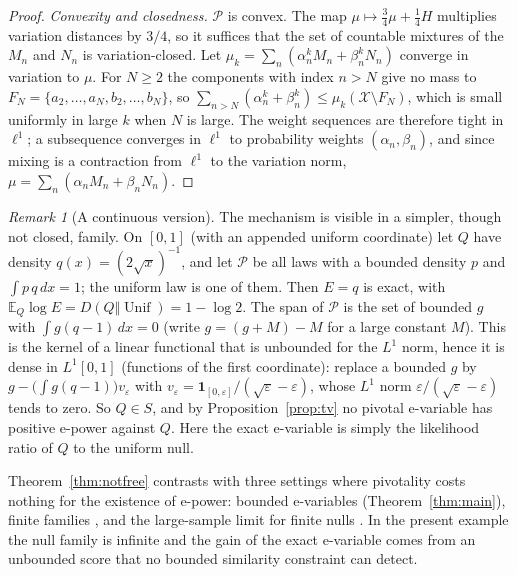 \documentclass[11pt,a4paper]{article}
\theoremstyle{definition}
\theoremstyle{remark}
\newtheorem{remark}[theorem]{Remark}
\newcommand{\PP}{\mathcal P}
\newcommand{\EE}{\mathbb E}
\newcommand{\one}{\mathbf 1}
\newcommand{\Unif}{\operatorname{Unif}}
\begin{document}
\begin{proof}
\emph{Convexity and closedness.} \(\PP\) is convex. The map \(\mu\mapsto\frac34\mu+\frac14H\) multiplies variation distances by \(3/4\), so it suffices that the set of countable mixtures of the \(M_n\) and \(N_n\) is variation-closed. Let \(\mu_k=\sum_n(\alpha^k_nM_n+\beta^k_nN_n)\) converge in variation to \(\mu\). For \(N\ge2\) the components with index \(n>N\) give no mass to \(F_N=\{a_2,\dots,a_N,b_2,\dots,b_N\}\), so \(\sum_{n>N}(\alpha^k_n+\beta^k_n)\le\mu_k(\mathcal X\setminus F_N)\), which is small uniformly in large \(k\) when \(N\) is large. The weight sequences are therefore tight in \(\ell^1\); a subsequence converges in \(\ell^1\) to probability weights \((\alpha_n,\beta_n)\), and since mixing is a contraction from \(\ell^1\) to the variation norm, \(\mu=\sum_n(\alpha_nM_n+\beta_nN_n)\).
\end{proof}

\begin{remark}[A continuous version]\label{rem:continuous}
The mechanism is visible in a simpler, though not closed, family. On \([0,1]\) (with an appended uniform coordinate) let \(Q\) have density \(q(x)=(2\sqrt x)^{-1}\), and let \(\PP\) be all laws with a bounded density \(p\) and \(\int p\,q\,dx=1\); the uniform law is one of them. Then \(E=q\) is exact, with \(\EE_Q\log E=D(Q\Vert\Unif)=1-\log2\). The span of \(\PP\) is the set of bounded \(g\) with \(\int g(q-1)\,dx=0\) (write \(g=(g+M)-M\) for a large constant \(M\)). This is the kernel of a linear functional that is unbounded for the \(L^1\) norm, hence it is dense in \(L^1[0,1]\) (functions of the first coordinate): replace a bounded \(g\) by \(g-\bigl(\int g(q-1)\bigr)v_\varepsilon\) with \(v_\varepsilon=\one_{[0,\varepsilon]}/(\sqrt\varepsilon-\varepsilon)\), whose \(L^1\) norm \(\varepsilon/(\sqrt\varepsilon-\varepsilon)\) tends to zero. So \(Q\in S\), and by Proposition~\ref{prop:tv} no pivotal e-variable has positive e-power against \(Q\). Here the exact e-variable is simply the likelihood ratio of \(Q\) to the uniform null.
\end{remark}

Theorem~\ref{thm:notfree} contrasts with three settings where pivotality costs nothing for the existence of e-power: bounded e-variables (Theorem~\ref{thm:main}), finite families \cite[Theorem~6.1]{ZRW}, and the large-sample limit for finite nulls \cite{HeCheng}. In the present example the null family is infinite and the gain of the exact e-variable comes from an unbounded score that no bounded similarity constraint can detect.
\end{document}
